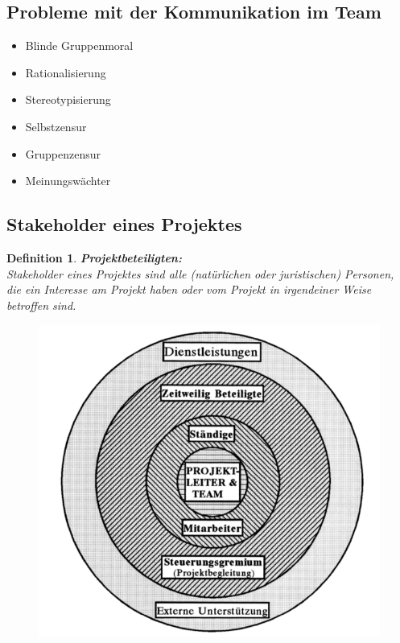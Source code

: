 \documentclass[11pt,a4paper]{article}
\newenvironment{de}[1]
{\begin{mdframed}[style=de]\begin{mydef}{\textbf{#1:}}\\} 
{\end{mydef}\end{mdframed}}
\newtheorem{mydef}{Definition}
\begin{document}
\subsection{Probleme mit der Kommunikation im Team}
\begin{itemize}
\item Blinde Gruppenmoral
\item Rationalisierung
\item Stereotypisierung
\item Selbstzensur
\item Gruppenzensur
\item Meinungswächter
\end{itemize}

\subsection{Stakeholder eines Projektes}
\begin{de}{Projektbeteiligten}

Stakeholder eines Projektes sind alle (natürlichen oder juristischen)
Personen, die ein Interesse am Projekt haben oder vom Projekt in
irgendeiner Weise betroffen sind.

\end{de}

\begin{figure}[H]
\centering
\includegraphics[scale=0.35]{ch5/stakeholder}
\end{figure}
\pagebreak
\end{document}
